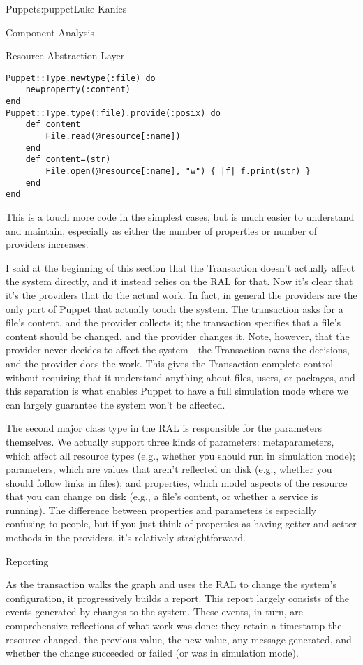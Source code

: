 \begin{aosachapter}{Puppet}{s:puppet}{Luke Kanies}
\begin{aosasect1}{Component Analysis}
\begin{aosasect2}{Resource Abstraction Layer}
\begin{verbatim}
Puppet::Type.newtype(:file) do
    newproperty(:content)
end
Puppet::Type.type(:file).provide(:posix) do
    def content
        File.read(@resource[:name])
    end
    def content=(str)
        File.open(@resource[:name], "w") { |f| f.print(str) }
    end
end
\end{verbatim}

This is a touch more code in the simplest cases, but is much easier to
understand and maintain, especially as either the number of properties
or number of providers increases.

I said at the beginning of this section that the Transaction doesn't
actually affect the system directly, and it instead relies on the RAL
for that.  Now it's clear that it's the providers that do the actual
work.  In fact, in general the providers are the only part of Puppet
that actually touch the system.  The transaction asks for a file's
content, and the provider collects it; the transaction specifies that a
file's content should be changed, and the provider changes it.  Note,
however, that the provider never decides to affect the system---the
Transaction owns the decisions, and the provider does the work.  This
gives the Transaction complete control without requiring that it
understand anything about files, users, or packages, and this
separation is what enables Puppet to have a full simulation mode where
we can largely guarantee the system won't be affected.

The second major class type in the RAL is responsible for the
parameters themselves.  We actually support three kinds of parameters:
metaparameters, which affect all resource types (e.g., whether you
should run in simulation mode); parameters, which are values that
aren't reflected on disk (e.g., whether you should follow links in
files); and properties, which model aspects of the resource that you
can change on disk (e.g., a file's content, or whether a service is
running).  The difference between properties and parameters is
especially confusing to people, but if you just think of properties as
having getter and setter methods in the providers, it's relatively
straightforward.

\end{aosasect2}

\begin{aosasect2}{Reporting}

As the transaction walks the graph and uses the RAL to change the
system's configuration, it progressively builds a report.  This report
largely consists of the events generated by changes to the system.
These events, in turn, are comprehensive reflections of what work was
done: they retain a timestamp the resource changed, the previous
value, the new value, any message generated, and whether the change
succeeded or failed (or was in simulation mode).


\end{aosasect2}
\end{aosasect1}
\end{aosachapter}
